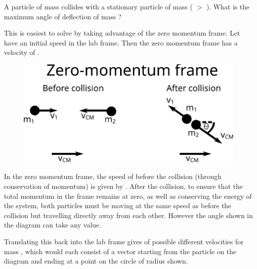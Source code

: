 
\begin{problem}   %
{A particle of mass  collides with a stationary particle of mass  ( $>$ ). What is the maximum angle of deflection of mass ?} 
{} 
{This is easiest to solve by taking advantage of the zero momentum frame. Let  have an initial speed  in the lab frame. Then the zero momentum frame has a velocity of .

\begin{figure}[h]
\centering
\includegraphics[width=1.0\textwidth]{../../../figures/dynamics_zero_momentum_frame_deflection.svg}
\caption{}\label{fig:dynamics_zero_momentum_frame_deflection}
\end{figure}


In the zero momentum frame, the speed of  before the collision (through conservation of momentum) is given by . After the collision, to ensure that the total momentum in the frame remains at zero, as well as conserving the energy of the system, both particles must be moving at the same speed as before the collision but travelling directly away from each other. However the angle \vari{\theta} shown in the diagram can take any value.


Translating this back into the lab frame gives of possible different velocities for mass  , which would each consist of a vector starting from the particle on the diagram and ending at a point on the circle of radius  shown.

}
\end{problem}
